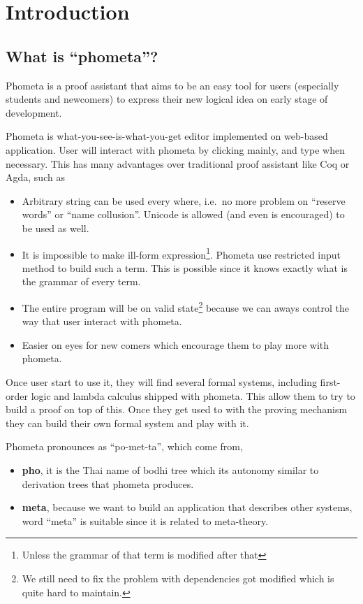 

\chapter{Introduction}

\section{What is ``phometa''?}

Phometa is a proof assistant that aims to be an easy tool for users (especially students and newcomers) to express their new logical idea on early stage of development.

Phometa is what-you-see-is-what-you-get editor implemented on web-based application. User will interact with phometa by clicking mainly, and type when necessary. This has many advantages over traditional proof assistant like Coq or Agda, such as
\begin{itemize}
    \item Arbitrary string can be used every where, i.e.\ no more problem on ``reserve words'' or ``name collusion''. Unicode is allowed (and even is encouraged) to be used as well.
    \item It is impossible to make ill-form expression\footnote{Unless the grammar of that term is modified after that}. Phometa use restricted input method to build such a term. This is possible since it knows exactly what is the grammar of every term.
    \item The entire program will be on valid state\footnote{We still need to fix the problem with dependencies got modified which is quite hard to maintain.} because we can aways control the way that user interact with phometa.
    \item Easier on eyes for new comers which encourage them to play more with phometa.
\end{itemize}

Once user start to use it, they will find several formal systems, including first-order logic and lambda calculus shipped with phometa. This allow them to try to build a proof on top of this. Once they get used to with the proving mechanism they can build their own formal system and play with it.

Phometa pronounces as ``po-met-ta'', which come from,
\begin{itemize}
    \item \textbf{pho}, it is the Thai name of bodhi tree which its autonomy similar to derivation trees that phometa produces.
    \item \textbf{meta}, because we want to build an application that describes other systems, word ``meta'' is suitable since it is related to meta-theory.
\end{itemize}

